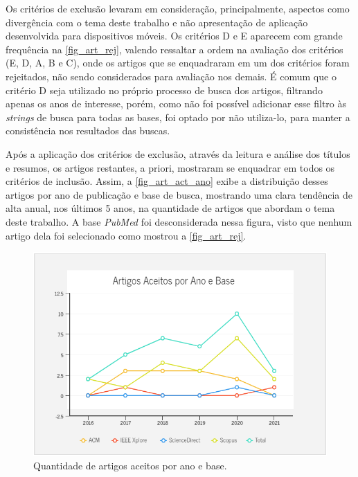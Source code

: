 Os critérios de exclusão levaram em consideração, principalmente, aspectos como divergência com o tema deste trabalho e não apresentação de aplicação desenvolvida para dispositivos móveis. Os critérios D e E aparecem com grande frequência na \autoref{fig_art_rej}, valendo ressaltar a ordem na avaliação dos critérios (E, D, A, B e C), onde os artigos que se enquadraram em um dos critérios foram rejeitados, não sendo considerados para avaliação nos demais. É comum que o critério D seja utilizado no próprio processo de busca dos artigos, filtrando apenas os anos de interesse, porém, como não foi possível adicionar esse filtro às \emph{strings} de busca para todas as bases, foi optado por não utiliza-lo, para manter a consistência nos resultados das buscas.

Após a aplicação dos critérios de exclusão, através da leitura e análise dos títulos e resumos, os artigos restantes, a priori, mostraram se enquadrar em todos os critérios de inclusão. Assim, a \autoref{fig_art_act_ano} exibe a distribuição desses artigos por ano de publicação e base de busca, mostrando uma clara tendência de alta anual, nos últimos 5 anos, na quantidade de artigos que abordam o tema deste trabalho. A base \emph{PubMed} foi desconsiderada nessa figura, visto que nenhum artigo dela foi selecionado como mostrou a \autoref{fig_art_rej}. 

\begin{figure}[htb]
	\caption{\label{fig_art_act_ano}Quantidade de artigos aceitos por ano e base.}
	\begin{center}
	    \includegraphics[scale=0.85]{Imagens/msl/artigos_aceitos_ano_base.png}
	\end{center}
\end{figure}

